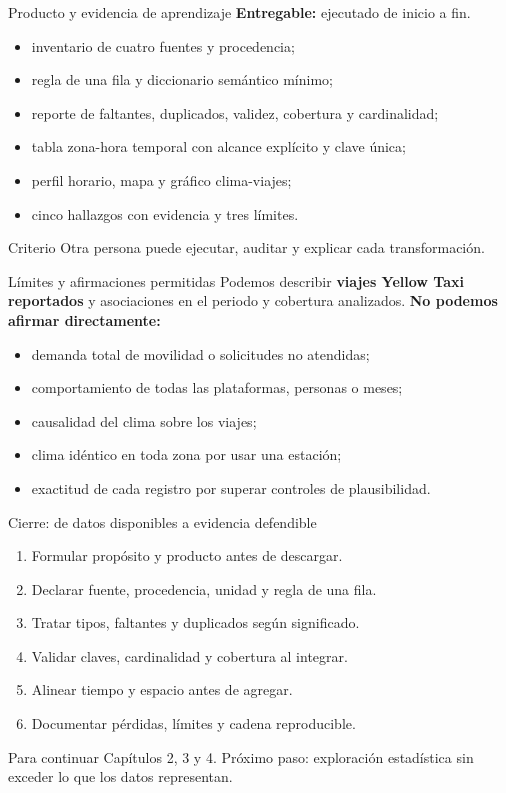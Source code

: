 \documentclass[aspectratio=169,11pt]{beamer}
\newcommand{\codigo}[1]{\texttt{\detokenize{#1}}}
\begin{document}
\begin{frame}{Producto y evidencia de aprendizaje}
  \small
  \textbf{Entregable:} \codigo{Taller_Clase_02_Movilidad.ipynb} ejecutado de inicio a fin.
  \begin{itemize}
    \item inventario de cuatro fuentes y procedencia;
    \item regla de una fila y diccionario semántico mínimo;
    \item reporte de faltantes, duplicados, validez, cobertura y cardinalidad;
    \item tabla zona-hora temporal con alcance explícito y clave única;
    \item perfil horario, mapa y gráfico clima-viajes;
    \item cinco hallazgos con evidencia y tres límites.
  \end{itemize}
  \begin{block}{Criterio}
    Otra persona puede ejecutar, auditar y explicar cada transformación.
  \end{block}
\end{frame}

\begin{frame}{Límites y afirmaciones permitidas}
  Podemos describir \textbf{viajes Yellow Taxi reportados} y asociaciones en el periodo y cobertura analizados.
  \vspace{.4em}
  \textbf{No podemos afirmar directamente:}
  \begin{itemize}
    \item demanda total de movilidad o solicitudes no atendidas;
    \item comportamiento de todas las plataformas, personas o meses;
    \item causalidad del clima sobre los viajes;
    \item clima idéntico en toda zona por usar una estación;
    \item exactitud de cada registro por superar controles de plausibilidad.
  \end{itemize}
\end{frame}

\begin{frame}{Cierre: de datos disponibles a evidencia defendible}
  \small
  \begin{enumerate}
    \item Formular propósito y producto antes de descargar.
    \item Declarar fuente, procedencia, unidad y regla de una fila.
    \item Tratar tipos, faltantes y duplicados según significado.
    \item Validar claves, cardinalidad y cobertura al integrar.
    \item Alinear tiempo y espacio antes de agregar.
    \item Documentar pérdidas, límites y cadena reproducible.
  \end{enumerate}
  \vfill
  \begin{block}{Para continuar}
    Capítulos 2, 3 y 4. Próximo paso: exploración estadística sin exceder lo que los datos representan.
  \end{block}
\end{frame}
\end{document}
